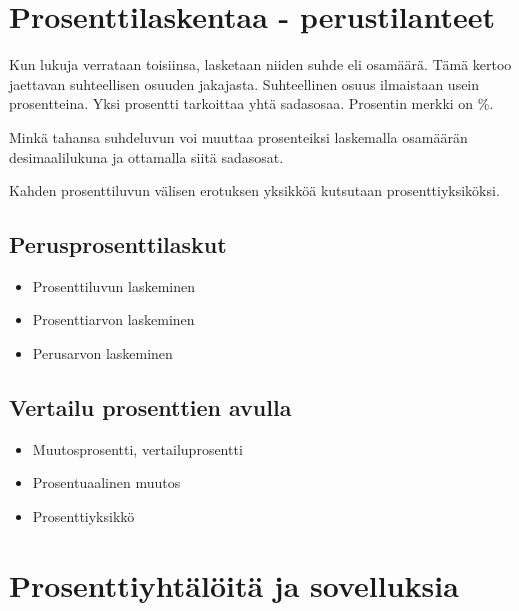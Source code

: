 \chapter{Prosenttilaskentaa - perustilanteet}

Kun lukuja verrataan toisiinsa, lasketaan niiden suhde eli osamäärä. Tämä kertoo jaettavan suhteellisen osuuden jakajasta. Suhteellinen osuus ilmaistaan usein prosentteina. Yksi prosentti tarkoittaa yhtä sadasosaa. Prosentin merkki on $\%$.



Minkä tahansa suhdeluvun voi muuttaa prosenteiksi laskemalla osamäärän desimaalilukuna ja ottamalla siitä sadasosat.

Kahden prosenttiluvun välisen erotuksen yksikköä kutsutaan prosenttiyksiköksi.

\section{Perusprosenttilaskut}

\begin{itemize}
	\item Prosenttiluvun laskeminen
	\item Prosenttiarvon laskeminen
	\item Perusarvon laskeminen
\end{itemize}

\section{Vertailu prosenttien avulla}

\begin{itemize}
	\item Muutosprosentti, vertailuprosentti
	\item Prosentuaalinen muutos
	\item Prosenttiyksikkö
\end{itemize}

\chapter{Prosenttiyhtälöitä ja sovelluksia}

